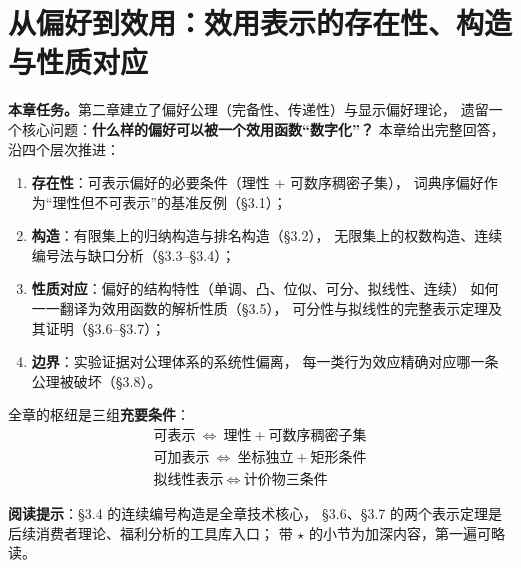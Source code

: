 



\chapter{从偏好到效用：效用表示的存在性、构造与性质对应}

\noindent\textbf{本章任务。}第二章建立了偏好公理（完备性、传递性）与显示偏好理论，
遗留一个核心问题：\textbf{什么样的偏好可以被一个效用函数“数字化”？}
本章给出完整回答，沿四个层次推进：
\begin{enumerate}
  \item \textbf{存在性}：可表示偏好的必要条件（理性 + 可数序稠密子集），
        词典序偏好作为“理性但不可表示”的基准反例（§3.1）；
  \item \textbf{构造}：有限集上的归纳构造与排名构造（§3.2），
        无限集上的权数构造、连续编号法与缺口分析（§3.3--§3.4）；
  \item \textbf{性质对应}：偏好的结构特性（单调、凸、位似、可分、拟线性、连续）
        如何一一翻译为效用函数的解析性质（§3.5），
        可分性与拟线性的完整表示定理及其证明（§3.6--§3.7）；
  \item \textbf{边界}：实验证据对公理体系的系统性偏离，
        每一类行为效应精确对应哪一条公理被破坏（§3.8）。
\end{enumerate}

\noindent 全章的枢纽是三组\textbf{充要条件}：
\begin{gather*}
\boxed{\ \text{可表示}\ \Longleftrightarrow\ \text{理性}+\text{可数序稠密子集}\ }\\[2pt]
\boxed{\ \text{可加表示}\ \Longleftrightarrow\ \text{坐标独立}+\text{矩形条件}\ }\\[2pt]
\boxed{\ \text{拟线性表示}\ \Longleftrightarrow\ \text{计价物三条件}\ }
\end{gather*}

\medskip
\noindent\textbf{阅读提示}：§3.4 的连续编号构造是全章技术核心，
§3.6、§3.7 的两个表示定理是后续消费者理论、福利分析的工具库入口；
带 $\star$ 的小节为加深内容，第一遍可略读。

\tableofcontents
\clearpage
















